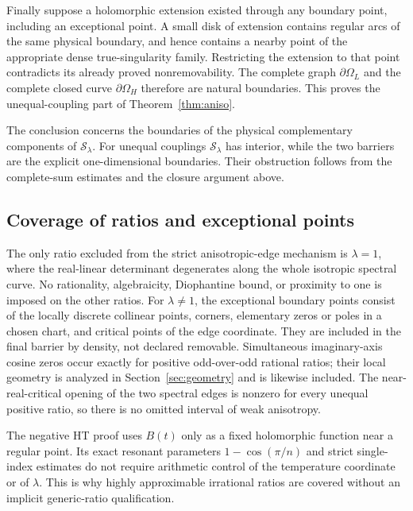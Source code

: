 \documentclass[11pt]{article}
\numberwithin{equation}{section}
\theoremstyle{definition}
\newcommand{\cS}{\mathcal S}
\newcommand{\OH}{\Omega_H}
\newcommand{\OL}{\Omega_L}
\begin{document}
Finally suppose a holomorphic extension existed through any boundary
point, including an exceptional point. A small disk of extension contains
regular arcs of the same physical boundary, and hence contains a nearby
point of the appropriate dense true-singularity family. Restricting the
extension to that point contradicts its already proved nonremovability.
The complete graph $\partial\OL$ and the complete closed curve
$\partial\OH$ therefore are natural boundaries. This proves
the unequal-coupling part of Theorem~\ref{thm:aniso}.

The conclusion concerns the boundaries of the physical complementary
components of $\cS_\lambda$. For unequal couplings $\cS_\lambda$ has
interior, while the two barriers are the explicit one-dimensional
boundaries. Their obstruction follows from the complete-sum estimates
and the closure argument above.

\subsection{Coverage of ratios and exceptional points}
The only ratio excluded from the strict anisotropic-edge mechanism is
$\lambda=1$, where the real-linear determinant degenerates along the
whole isotropic spectral curve. No rationality, algebraicity,
Diophantine bound, or proximity to one is imposed on the other ratios.
For $\lambda\ne1$, the exceptional boundary points consist of the
locally discrete collinear points, corners, elementary zeros or poles
in a chosen chart, and critical points of the edge coordinate. They
are included in the final barrier by density, not declared removable.
Simultaneous imaginary-axis cosine zeros occur exactly for positive
odd-over-odd rational ratios; their local geometry is analyzed in
Section~\ref{sec:geometry} and is likewise included. The near-real-critical
opening of the two spectral edges is nonzero for every unequal positive
ratio, so there is no omitted interval of weak anisotropy.

The negative HT proof uses $B(t)$ only as a fixed holomorphic function
near a regular point. Its exact resonant parameters
$1-\cos(\pi/n)$ and strict single-index estimates do not require
arithmetic control of the temperature coordinate or of $\lambda$.
This is why highly approximable irrational ratios are covered without
an implicit generic-ratio qualification.
\end{document}
